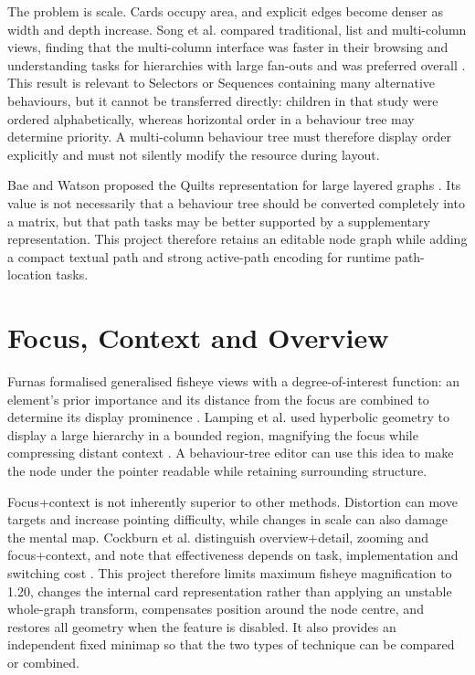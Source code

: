 The problem is scale. Cards occupy area, and explicit edges become denser as width and depth increase. Song et al. compared traditional, list and multi-column views, finding that the multi-column interface was faster in their browsing and understanding tasks for hierarchies with large fan-outs and was preferred overall \parencite{song2010largefanout}. This result is relevant to Selectors or Sequences containing many alternative behaviours, but it cannot be transferred directly: children in that study were ordered alphabetically, whereas horizontal order in a behaviour tree may determine priority. A multi-column behaviour tree must therefore display order explicitly and must not silently modify the resource during layout.

Bae and Watson proposed the Quilts representation for large layered graphs \parencite{bae2011quilts}. Its value is not necessarily that a behaviour tree should be converted completely into a matrix, but that path tasks may be better supported by a supplementary representation. This project therefore retains an editable node graph while adding a compact textual path and strong active-path encoding for runtime path-location tasks.

\section{Focus, Context and Overview}

Furnas formalised generalised fisheye views with a degree-of-interest function: an element's prior importance and its distance from the focus are combined to determine its display prominence \parencite{furnas1986fisheye}. Lamping et al. used hyperbolic geometry to display a large hierarchy in a bounded region, magnifying the focus while compressing distant context \parencite{lamping1995hyperbolic}. A behaviour-tree editor can use this idea to make the node under the pointer readable while retaining surrounding structure.

Focus+context is not inherently superior to other methods. Distortion can move targets and increase pointing difficulty, while changes in scale can also damage the mental map. Cockburn et al. distinguish overview+detail, zooming and focus+context, and note that effectiveness depends on task, implementation and switching cost \parencite{cockburn2008review}. This project therefore limits maximum fisheye magnification to 1.20, changes the internal card representation rather than applying an unstable whole-graph transform, compensates position around the node centre, and restores all geometry when the feature is disabled. It also provides an independent fixed minimap so that the two types of technique can be compared or combined.

